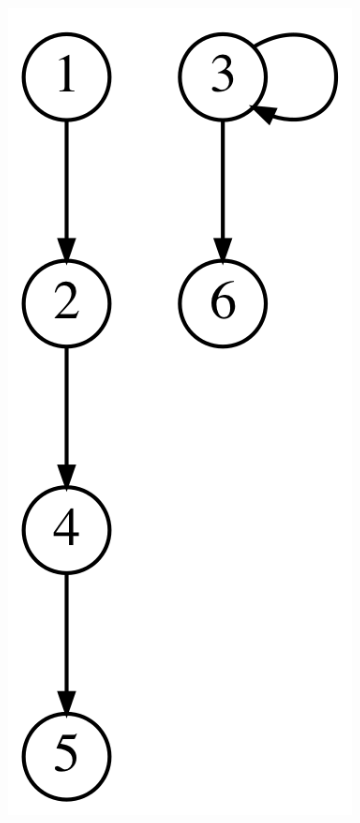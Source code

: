 \begin{figure}
\begin{subfigure}[b]{0.1\textwidth}
        \includegraphics[width=\textwidth]{./sezione3/experimental_results/plots/hopcroft_graph_1.png}

\end{subfigure}
\end{figure}
